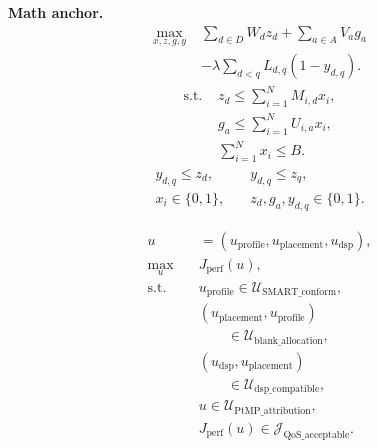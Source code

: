 \textbf{Math anchor.}
\begin{equation}
    \begin{split}
        \max_{x,z,g,y}\; & \sum_{d \in D} W_d z_d + \sum_{a \in A} V_a g_a \\
                         & - \lambda \sum_{d<q} L_{d,q}(1-y_{d,q}).
    \end{split}
\end{equation}
\begin{equation}
    \begin{split}
        \text{s.t. } & z_d \le \sum_{i=1}^{N} M_{i,d}x_i, \\
                     & g_a \le \sum_{i=1}^{N} U_{i,a}x_i, \\
                     & \sum_{i=1}^{N}x_i \le B.
    \end{split}
\end{equation}
\begin{equation}
    \begin{split}
        y_{d,q}\le z_d,\quad  & y_{d,q}\le z_q,            \\
        x_i \in \{0,1\},\quad & z_d,g_a,y_{d,q}\in\{0,1\}.
    \end{split}
\end{equation}

\begin{equation}
    \begin{aligned}
        u             & = (u_{\mathrm{profile}},u_{\mathrm{placement}},u_{\mathrm{dsp}}), \\
        \max_{u}\quad & J_{\mathrm{perf}}(u),                                             \\
        \text{s.t.}\quad
                      & u_{\mathrm{profile}} \in \mathcal{U}_{\mathrm{SMART\_conform}},   \\
                      & (u_{\mathrm{placement}},u_{\mathrm{profile}})                     \\
                      & \qquad \in \mathcal{U}_{\mathrm{blank\_allocation}},              \\
                      & (u_{\mathrm{dsp}},u_{\mathrm{placement}})                         \\
                      & \qquad \in \mathcal{U}_{\mathrm{dsp\_compatible}},                \\
                      & u \in \mathcal{U}_{\mathrm{PtMP\_attribution}},                   \\
                      & J_{\mathrm{perf}}(u) \in \mathcal{J}_{\mathrm{QoS\_acceptable}}.
    \end{aligned}
\end{equation}

